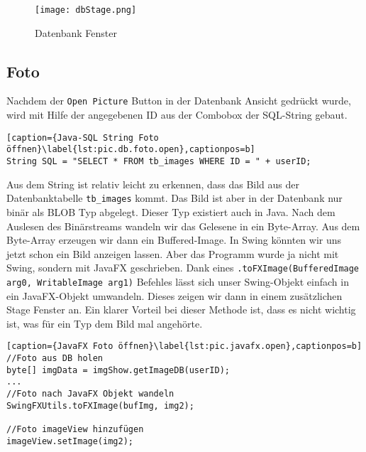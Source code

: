 \begin{figure}[h]
  \begin{center}
    \texttt{[image: dbStage.png]}
  		  \caption{Datenbank Fenster}
     \label{fig.DatenbankFenster}
  \end{center}
\end{figure}

\subsection{Foto}
\label{subsec.foto}
Nachdem der \texttt{Open Picture} Button in der Datenbank Ansicht gedrückt wurde, wird mit Hilfe der angegebenen ID aus der Combobox der SQL-String gebaut.

\begin{lstlisting}[caption={Java-SQL String Foto öffnen}\label{lst:pic.db.foto.open},captionpos=b]
String SQL = "SELECT * FROM tb_images WHERE ID = " + userID;
\end{lstlisting}

Aus dem String ist relativ leicht zu erkennen, dass das Bild aus der Datenbanktabelle \texttt{tb\_images} kommt. Das Bild ist aber in der Datenbank nur binär als BLOB Typ abgelegt. Dieser Typ existiert auch in Java. Nach dem Auslesen des Binärstreams wandeln wir das Gelesene in ein Byte-Array. Aus dem Byte-Array erzeugen wir dann ein Buffered-Image. In Swing könnten wir uns jetzt schon ein Bild anzeigen lassen. Aber das Programm wurde ja nicht mit Swing, sondern mit JavaFX geschrieben. Dank eines \texttt{.toFXImage(BufferedImage arg0, WritableImage arg1)} Befehles lässt sich unser Swing-Objekt einfach in ein JavaFX-Objekt umwandeln. Dieses zeigen wir dann in einem zusätzlichen Stage Fenster an. Ein klarer Vorteil bei dieser Methode ist, dass es nicht wichtig ist, was für ein Typ dem Bild mal angehörte.
\begin{lstlisting}[caption={JavaFX Foto öffnen}\label{lst:pic.javafx.open},captionpos=b]
//Foto aus DB holen
byte[] imgData = imgShow.getImageDB(userID);
...
//Foto nach JavaFX Objekt wandeln
SwingFXUtils.toFXImage(bufImg, img2);

//Foto imageView hinzufügen
imageView.setImage(img2);
\end{lstlisting}

